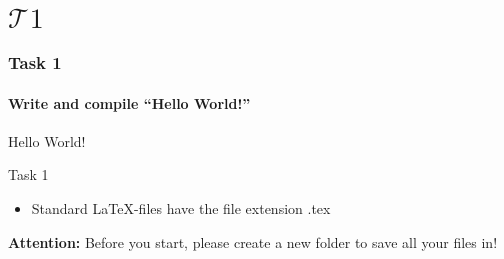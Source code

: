 \section{$\mathcal{T}1$} 
\begin{frame}
\frametitle{Task 1}
\framesubtitle{Write and compile ``Hello World!''}
\begin{center}
\begin{rm}
\Large Hello World!\\
\end{rm}
\end{center}
\bigskip
\bigskip
\bigskip
\begin{block}{Task 1}
\begin{itemize}
\item Standard \LaTeX -files have the file extension {\ttfamily .tex}
\end{itemize}
\end{block}
\begin{alertblock}{\textbf{Attention:}}
Before you start, please create a new folder to save all your files in!
\end{alertblock}
\end{frame}